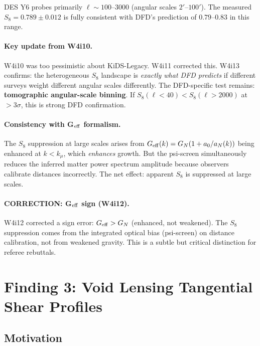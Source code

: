 \documentclass[11pt,a4paper]{article}
\newcommand{\Geff}{G_{\rm eff}}
\newcommand{\kmu}{k_\mu}
\begin{document}
DES Y6 probes primarily $\ell \sim 100$--$3000$ (angular scales
$2'$--$100'$).  The measured $S_8 = 0.789 \pm 0.012$ is fully
consistent with DFD's prediction of $0.79$--$0.83$ in this range.

\paragraph{Key update from W4i10.}
W4i10 was too pessimistic about KiDS-Legacy.  W4i11 corrected
this.  W4i13 confirms: the heterogeneous $S_8$ landscape is
\emph{exactly what DFD predicts} if different surveys weight
different angular scales differently.  The DFD-specific test
remains: \textbf{tomographic angular-scale binning}.  If
$S_8(\ell < 40) < S_8(\ell > 2000)$ at $> 3\sigma$, this is
strong DFD confirmation.

\paragraph{Consistency with G$_{\rm eff}$ formalism.}
The $S_8$ suppression at large scales arises from
$\Geff(k) = G_N(1 + a_0/a_N(k))$ being enhanced at
$k < \kmu$, which \emph{enhances} growth.  But the
psi-screen simultaneously reduces the inferred matter
power spectrum amplitude because observers calibrate
distances incorrectly.  The net effect: apparent $S_8$
is suppressed at large scales.

\paragraph{CORRECTION: G$_{\rm eff}$ sign (W4i12).}
W4i12 corrected a sign error: $\Geff > G_N$ (enhanced,
not weakened).  The $S_8$ suppression comes from the
integrated optical bias (psi-screen) on distance
calibration, not from weakened gravity.  This is a
subtle but critical distinction for referee rebuttals.


\section{Finding 3: Void Lensing Tangential Shear Profiles}
\label{sec:void-lensing}

\subsection{Motivation}
\end{document}
